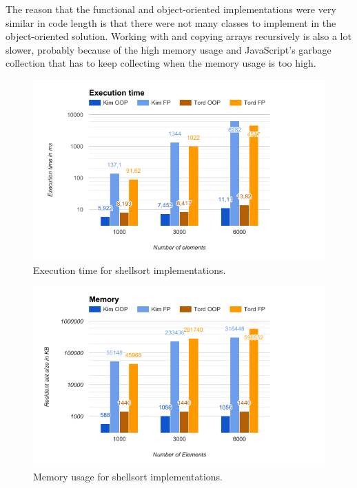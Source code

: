 \documentclass {article}
\begin{document}
The reason that the functional and object-oriented implementations were very similar in code length is that there were not many classes to implement in the object-oriented solution. Working with and copying arrays recursively is also a lot slower, probably because of the high memory usage and JavaScript's garbage collection that has to keep collecting when the memory usage is too high.

\begin{figure}[H]
\includegraphics[width=\textwidth]{shellsort-runtime}

\caption{Execution time for shellsort implementations.}
\label{fig:shellsort-runtime}
\end{figure}

\begin{figure}[H]
\includegraphics[width=\textwidth]{shellsort-memory}

\caption{Memory usage for shellsort implementations.}
\label{fig:shellsort-memory}
\end{figure}
\end{document}
